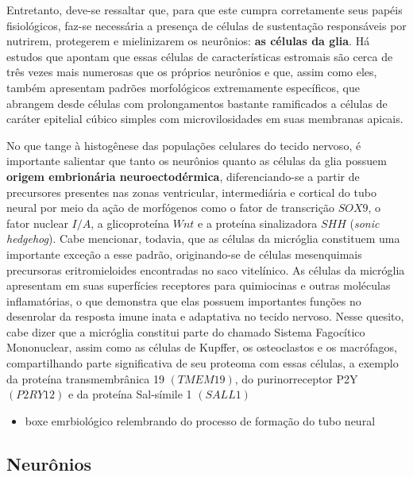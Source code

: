 \documentclass[
]{book}
\providecommand{\tightlist}{%
  \setlength{\itemsep}{0pt}\setlength{\parskip}{0pt}}
\theoremstyle{definition}
\theoremstyle{definition}
\theoremstyle{definition}
\theoremstyle{definition}
\theoremstyle{remark}
\begin{document}
Entretanto, deve-se ressaltar que, para que este cumpra corretamente seus papéis fisiológicos, faz-se necessária a presença de células de sustentação responsáveis por nutrirem, protegerem e mielinizarem os neurônios: \textbf{as células da glia}. Há estudos que apontam que essas células de características estromais são cerca de três vezes mais numerosas que os próprios neurônios e que, assim como eles, também apresentam padrões morfológicos extremamente específicos, que abrangem desde células com prolongamentos bastante ramificados a células de caráter epitelial cúbico simples com microvilosidades em suas membranas apicais.

No que tange à histogênese das populações celulares do tecido nervoso, é importante salientar que tanto os neurônios quanto as células da glia possuem \textbf{origem embrionária neuroectodérmica}, diferenciando-se a partir de precursores presentes nas zonas ventricular, intermediária e cortical do tubo neural por meio da ação de morfógenos como o fator de transcrição \(SOX9\), o fator nuclear \(I/A\), a glicoproteína \(Wnt\) e a proteína sinalizadora \(SHH\) (\emph{sonic hedgehog}). Cabe mencionar, todavia, que as células da micróglia constituem uma importante exceção a esse padrão, originando-se de células mesenquimais precursoras eritromieloides encontradas no saco vitelínico. As células da micróglia apresentam em suas superfícies receptores para quimiocinas e outras moléculas inflamatórias, o que demonstra que elas possuem importantes funções no desenrolar da resposta imune inata e adaptativa no tecido nervoso. Nesse quesito, cabe dizer que a micróglia constitui parte do chamado Sistema Fagocítico Mononuclear, assim como as células de Kupffer, os osteoclastos e os macrófagos, compartilhando parte significativa de seu proteoma com essas células, a exemplo da proteína transmembrânica 19 \((TMEM19)\), do purinorreceptor P2Y \((P2RY12)\) e da proteína Sal-símile 1 \((SALL1)\)

\begin{itemize}
\tightlist
\item
  boxe emrbiológico relembrando do processo de formação do tubo neural
\end{itemize}

\hypertarget{neuruxf4nios}{%
\subsection*{Neurônios}\label{neuruxf4nios}}
\end{document}
